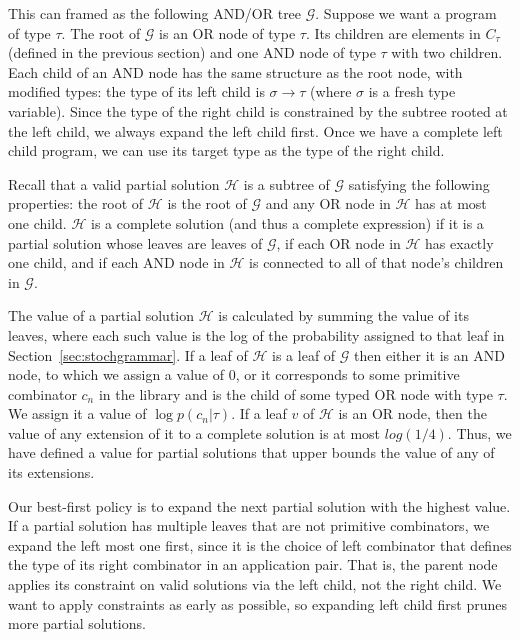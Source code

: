 \documentclass{article}
\begin{document}
This can framed as the following AND/OR tree $\mathcal{G}$. Suppose we
want a program of type $\tau$. The root of $\mathcal{G}$ is an OR node of
type $\tau$. Its children are elements in $C_\tau$ (defined in the previous
section) and one AND node of type $\tau$ with two children. Each child of
an AND node has the same structure as the root node, with modified
types: the type of its left child is $\sigma \rightarrow \tau$ (where $\sigma$ is
a fresh type variable). Since the type of the right child is
constrained by the subtree rooted at the left child, we always expand
the left child first. Once we have a complete left child program, we
can use its target type as the type of the right child.

Recall that a valid partial solution $\mathcal{H}$ is a subtree of
$\mathcal{G}$ satisfying the following properties: the root of
$\mathcal{H}$ is the root of $\mathcal{G}$ and any OR node in
$\mathcal{H}$ has at most one child. $\mathcal{H}$ is a complete
solution (and thus a complete expression) if it is a partial solution
whose leaves are leaves of $\mathcal{G}$, if each OR node in
$\mathcal{H}$ has exactly one child, and if each AND node in
$\mathcal{H}$ is connected to all of that node's children in
$\mathcal{G}$.

The value of a partial solution $\mathcal{H}$ is calculated by summing
the value of its leaves, where each such value is the log of the
probability assigned to that leaf in
Section~\ref{sec:stochgrammar}. If a leaf of $\mathcal{H}$ is a leaf
of $\mathcal{G}$ then either it is an AND node, to which we assign a
value of 0, or it corresponds to some primitive combinator $c_n$ in
the library and is the child of some typed OR node with type $\tau$. We
assign it a value of $\log{p(c_n | \tau)}$. If a leaf $v$ of
$\mathcal{H}$ is an OR node, then the value of any extension of it to
a complete solution is at most $log(1/4)$. Thus, we have defined a
value for partial solutions that upper bounds the value of any of its
extensions.

Our best-first policy is to expand the next partial solution
with the highest value. If a partial solution has multiple leaves that
are not primitive combinators, we expand the left most one first,
since it is the choice of left combinator that defines the type of its
right combinator in an application pair. That is, the parent node
applies its constraint on valid solutions via the left child, not the
right child. We want to apply constraints as early as possible, so
expanding left child first prunes more partial solutions.
\end{document}
